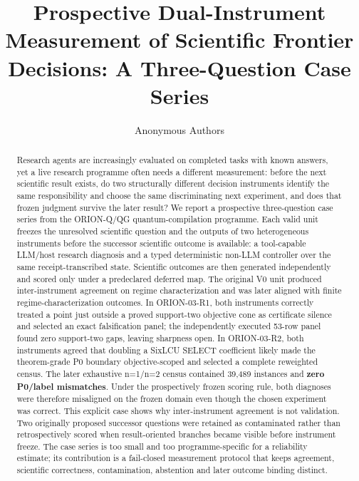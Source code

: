 \documentclass[10pt]{article}
\title{Prospective Dual-Instrument Measurement of Scientific Frontier
Decisions: A Three-Question Case Series}
\author{Anonymous Authors}
\date{}
\begin{document}
\maketitle

\begin{abstract}
Research agents are increasingly evaluated on completed tasks with known
answers, yet a live research programme often needs a different
measurement: before the next scientific result exists, do two
structurally different decision instruments identify the same
responsibility and choose the same discriminating next experiment, and
does that frozen judgment survive the later result? We report a
prospective three-question case series from the ORION-Q/QG
quantum-compilation programme. Each valid unit freezes the unresolved
scientific question and the outputs of two heterogeneous instruments
before the successor scientific outcome is available: a tool-capable
LLM/host research diagnosis and a typed deterministic non-LLM controller
over the same receipt-transcribed state. Scientific outcomes are then
generated independently and scored only under a predeclared deferred
map. The original V0 unit produced inter-instrument agreement on regime
characterization and was later aligned with finite
regime-characterization outcomes. In ORION-03-R1, both instruments
correctly treated a point just outside a proved support-two objective
cone as certificate silence and selected an exact falsification panel;
the independently executed 53-row panel found zero support-two gaps,
leaving sharpness open. In ORION-03-R2, both instruments agreed that
doubling a SixLCU SELECT coefficient likely made the theorem-grade P0
boundary objective-scoped and selected a complete reweighted census. The
later exhaustive n=1/n=2 census contained 39,489 instances and
\textbf{zero P0/label mismatches}. Under the prospectively frozen
scoring rule, both diagnoses were therefore misaligned on the frozen
domain even though the chosen experiment was correct. This explicit case
shows why inter-instrument agreement is not validation. Two originally
proposed successor questions were retained as contaminated rather than
retrospectively scored when result-oriented branches became visible
before instrument freeze. The case series is too small and too
programme-specific for a reliability estimate; its contribution is a
fail-closed measurement protocol that keeps agreement, scientific
correctness, contamination, abstention and later outcome binding
distinct.
\end{abstract}
\end{document}
